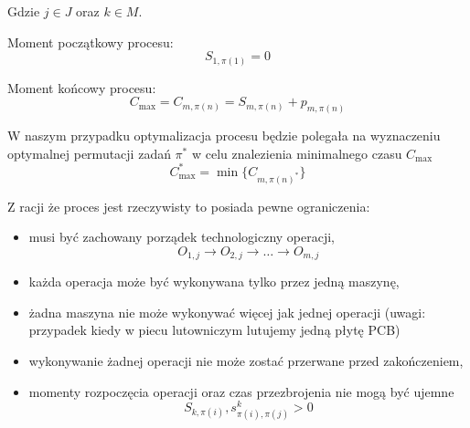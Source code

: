 Gdzie $ j \in J$ oraz $k \in M$.

Moment początkowy procesu:
\begin{equation}
	S_{1, \pi(1)}=0
\end{equation}

Moment końcowy procesu:
\begin{equation}
	C_{\max} = 	C_{m, \pi(n)} = S_{m, \pi(n)} + p_{m, \pi(n)}
\end{equation}

W naszym przypadku optymalizacja procesu będzie polegała na wyznaczeniu optymalnej permutacji zadań $\pi^*$
w celu znalezienia minimalnego czasu $C_{\max}$
\begin{equation}
	C_{\max}^{*} = \min\{C_{m, \pi{(n)}^{*}}\}
\end{equation}

Z racji że proces jest rzeczywisty to posiada pewne ograniczenia:
\begin{itemize}
	\item musi być zachowany porządek technologiczny operacji,
	      \begin{equation}
	      	O_{1, j} \rightarrow O_{2, j} \rightarrow \dots \rightarrow O_{m, j}
	      \end{equation}
	\item każda operacja może być wykonywana tylko przez jedną maszynę,
	\item żadna maszyna nie może wykonywać więcej jak jednej operacji (uwagi: przypadek kiedy w piecu lutowniczym lutujemy jedną płytę PCB)
	\item wykonywanie żadnej operacji nie może zostać przerwane przed zakończeniem,
	\item momenty rozpoczęcia operacji oraz czas przezbrojenia nie mogą być ujemne
	      \begin{equation}
	      	S_{k, \pi(i)}, s^{k}_{\pi(i), \pi(j)} > 0
	      \end{equation}
\end{itemize}
